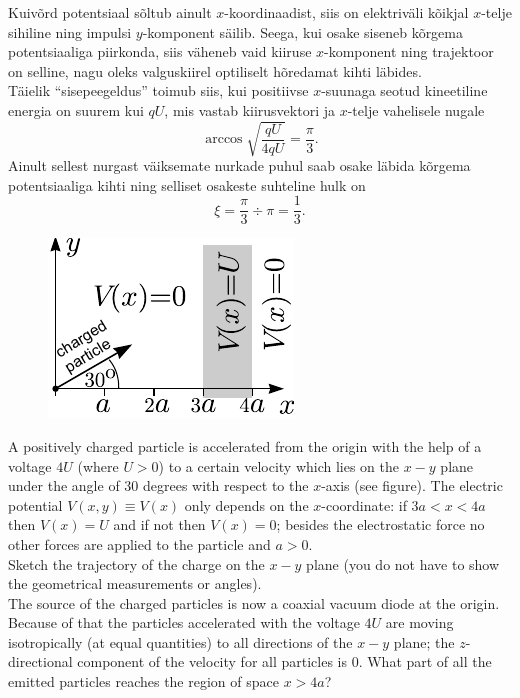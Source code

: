 {\ifSolution
\osa Kuivõrd potentsiaal sõltub ainult $x$-koordinaadist, siis on elektriväli kõikjal $x$-telje sihiline ning
impulsi $y$-komponent säilib. Seega, kui osake siseneb kõrgema potentsiaaliga piirkonda, siis 
väheneb vaid kiiruse $x$-komponent ning
trajektoor on selline, nagu oleks valguskiirel optiliselt hõredamat kihti läbides.\\
\osa Täielik \enquote{sisepeegeldus} toimub siis, kui positiivse $x$-suunaga 
seotud kineetiline energia on suurem kui $qU$, mis vastab kiirusvektori 
ja $x$-telje vahelisele nugale
\[
\arccos \sqrt{\frac {qU}{4qU}}=\frac \pi 3.
\]
Ainult sellest nurgast väiksemate nurkade puhul saab osake läbida kõrgema 
potentsiaaliga kihti ning selliset osakeste suhteline hulk on
\[
\xi = \frac \pi 3 \div \pi = \frac 13.
\]
\fi


\ifEngStatement
\begin{figure}%
\vspace{-10pt}
\includegraphics[width=\linewidth]{2012-v3g-09-laeng_ing}%
\end{figure}
A positively charged particle is accelerated from the origin with the help of a voltage $4U$ (where $U>0$) to a certain velocity which lies on the $x-y$ plane under the angle of $30$ degrees with respect to the $x$-axis (see figure). The electric potential $V(x,y)\equiv V(x)$ only depends on the $x$-coordinate: if $3a<x<4a$ then $V(x)=U$ and if not then $V(x)=0$; besides the electrostatic force no other forces are applied to the particle and $a>0$.\\
\osa Sketch the trajectory of the charge on the $x-y$ plane (you do not have to show the geometrical measurements or angles).\\
\osa The source of the charged particles is now a coaxial vacuum diode at the origin. Because of that the particles accelerated with the voltage $4U$ are moving isotropically (at equal quantities) to all directions of the $x-y$ plane; the $z$-directional component of the velocity for all particles is 0. What part of all the emitted particles reaches the region of space $x>4a$?
\fi


}
